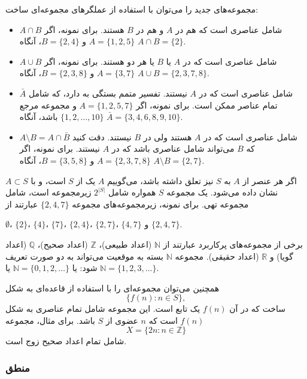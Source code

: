 \begin{samepage}
مجموعه‌های جدید را می‌توان با استفاده از عملگرهای مجموعه‌ای ساخت:
\begin{itemize}
\item {} $A \cap B$ شامل عناصری است
که هم در $A$ و هم در $B$ هستند.
برای نمونه، اگر $A=\{1,2,5\}$ و $B=\{2,4\}$،
آنگاه $A \cap B = \{2\}$.
\item {} $A \cup B$ شامل عناصری است
که در $A$ یا $B$ یا هر دو هستند.
برای نمونه، اگر $A=\{3,7\}$ و $B=\{2,3,8\}$،
آنگاه $A \cup B = \{2,3,7,8\}$.
\item {} $\bar A$ شامل عناصری است
که در $A$ نیستند.
تفسیر متمم بستگی به  دارد، که شامل تمام عناصر ممکن است.
برای نمونه، اگر $A=\{1,2,5,7\}$ و مجموعه مرجع
$\{1,2,\ldots,10\}$ باشد، آنگاه $\bar A = \{3,4,6,8,9,10\}$.
\item {} $A \setminus B = A \cap \bar B$
شامل عناصری است که در $A$ هستند ولی در $B$ نیستند.
دقت کنید که $B$ می‌تواند شامل عناصری باشد که در $A$ نیستند.
برای نمونه، اگر $A=\{2,3,7,8\}$ و $B=\{3,5,8\}$،
آنگاه $A \setminus B = \{2,7\}$.
\end{itemize}
\end{samepage}

اگر هر عنصر از $A$ به $S$ نیز تعلق داشته باشد،
می‌گوییم $A$ یک  از $S$ است،
و با $A \subset S$ نشان داده می‌شود.
یک مجموعه $S$ همواره شامل $2^{|S|}$ زیرمجموعه است،
شامل مجموعه تهی.
برای نمونه، زیرمجموعه‌های مجموعه $\{2,4,7\}$ عبارتند از
\begin{center}
$\emptyset$،
$\{2\}$، $\{4\}$، $\{7\}$، $\{2,4\}$، $\{2,7\}$، $\{4,7\}$ و $\{2,4,7\}$.
\end{center}

برخی از مجموعه‌های پرکاربرد عبارتند از
$\mathbb{N}$ (اعداد طبیعی)،
$\mathbb{Z}$ (اعداد صحیح)،
$\mathbb{Q}$ (اعداد گویا) و
$\mathbb{R}$ (اعداد حقیقی).
مجموعه $\mathbb{N}$
بسته به موقعیت می‌تواند به دو صورت تعریف شود:
یا $\mathbb{N}=\{0,1,2,\ldots\}$
یا $\mathbb{N}=\{1,2,3,...\}$.

همچنین می‌توان مجموعه‌ای را با استفاده از قاعده‌ای به شکل
\[\{f(n) : n \in S\},\]
ساخت که در آن $f(n)$ یک تابع است.
این مجموعه شامل تمام عناصری به شکل $f(n)$ است
که $n$ عضوی از $S$ باشد.
برای مثال، مجموعه
\[X=\{2n : n \in \mathbb{Z}\}\]
شامل تمام اعداد صحیح زوج است.

\subsubsection{منطق}

